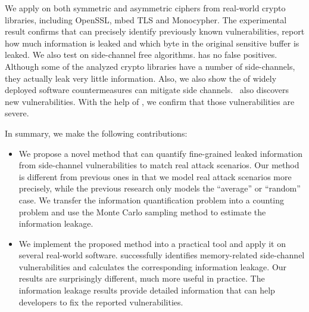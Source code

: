 We apply \tool{} on both symmetric and asymmetric ciphers from real-world crypto
libraries, including OpenSSL, mbed TLS and Monocypher\@. The experimental result confirms
that \tool{} can precisely identify previously known vulnerabilities, report
how much information is leaked and which byte in the original sensitive buffer
is leaked. We also test \tool{} on side-channel free algorithms. \tool{} has no
false positives.
Although some of the analyzed crypto libraries have a number of
side-channels, they actually leak very little information. Also, we also show the
of widely deployed software countermeasures can mitigate side channels.
\tool\ also discovers new vulnerabilities. With the help of \tool{}, we confirm
that those vulnerabilities are severe.

In summary, we make the following contributions:

\begin{itemize}
      \item We propose a novel method that can quantify fine-grained leaked
            information from side-channel vulnerabilities to match real attack
            scenarios. Our method is different from previous ones in that we
            model real attack scenarios more precisely, while the previous
            research only models the ``average'' or ``random'' case. 
            We transfer the information quantification problem into a counting
            problem and use the Monte Carlo sampling method to estimate the
            information leakage.


      \item We implement the proposed method into a practical tool and apply it
            on several real-world software. \tool{} successfully identifies
            memory-related side-channel vulnerabilities and calculates the
            corresponding information leakage. 
            Our results are surprisingly different, much more useful in practice.
            The information leakage results
            provide detailed information that can help developers to fix the
            reported vulnerabilities.
\end{itemize}


